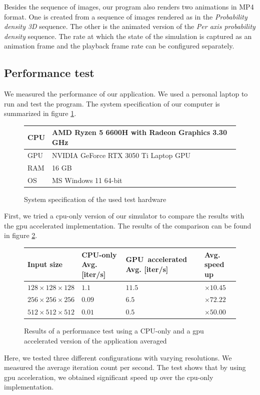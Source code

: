 Besides the sequence of images, our program also renders two animations in MP4 format.
One is created from a sequence of images rendered as in the \textit{Probability density 3D} sequence.
The other is the animated version of the \textit{Per axis probability density} sequence.
The rate at which the state of the simulation is captured as an animation frame and the playback frame rate can be configured separately.

\subsection{Performance test}

We measured the performance of our application.
We used a personal laptop to run and test the program.
The system specification of our computer is summarized in figure \ref{fig:system_spec}.
\begin{figure}[hbt!]
	\begin{center}
		\begin{tabular}{|m{5em}||m{25em}|}
			\hline
			CPU & AMD Ryzen 5 6600H with Radeon Graphics            3.30 GHz\\
			\hline
			GPU & NVIDIA GeForce RTX 3050 Ti Laptop GPU\\		
			\hline
			RAM & 16 GB\\		
			\hline
			OS & MS Windows 11 64-bit\\		
			\hline
		\end{tabular}
		\caption{System specification of the used test hardware}
		\label{fig:system_spec}
	\end{center}
\end{figure}
First, we tried a \acrshort{cpu}-only version of our simulator to compare the results with the \acrshort{gpu} accelerated implementation.
The results of the comparison can be found in figure \ref{fig:performance_test}.
\begin{figure}[hbt!]
	\begin{center}
		\begin{tabular}{|m{8em}||m{8em}| m{8em}| m{4em}|}
			\hline
			Input size & CPU-only Avg. [iter/s] & GPU~accelerated Avg. [iter/s] & Avg. speed up\\
			\hline
			$128 \times 128 \times 128$ & $1.1$ & $11.5$ & $\times 10.45$\\
			\hline
			$256 \times 256 \times 256$ & $0.09$ & $6.5$ & $\times 72.22$\\
			\hline
			$512 \times 512 \times 512$ & $0.01$ & $0.5$ & $\times 50.00$\\
			\hline
		\end{tabular}
		\caption{Results of a performance test using a CPU-only and a \acrshort{gpu} accelerated version of the application averaged}
		\label{fig:performance_test}
	\end{center}
\end{figure}
Here, we tested three different configurations with varying resolutions.
We measured the average iteration count per second.
The test shows that by using \acrshort{gpu} acceleration, we obtained significant speed up over the \acrshort{cpu}-only implementation.






